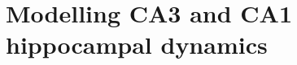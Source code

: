 \documentclass[../main.tex]{subfiles}
\begin{document}
\chapter{Modelling CA3 and CA1 hippocampal dynamics}




\printbibliography

\end{document}
